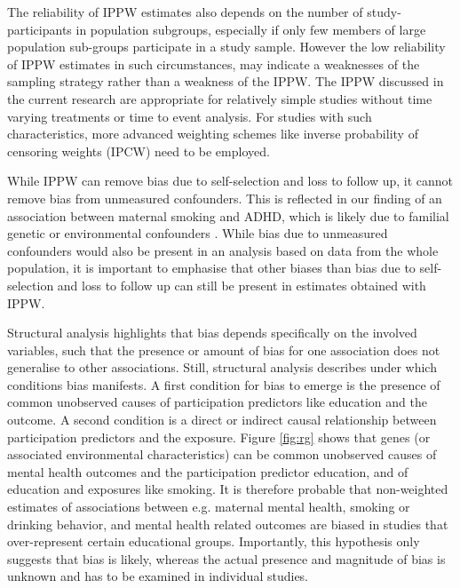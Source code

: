 \documentclass[12pt]{article}
\begin{document}
The reliability of IPPW estimates also depends on the number of study-participants in population subgroups, especially if only few members of large population sub-groups participate in a study sample. However the low reliability of IPPW estimates in such circumstances, may indicate a weaknesses of the sampling strategy rather than a weakness of the IPPW.
The IPPW discussed in the current research are appropriate for relatively simple studies without time varying treatments or time to event analysis. For studies with such characteristics, more advanced weighting schemes like inverse probability of censoring weights (IPCW\cite{Robins2000-fq}) need to be employed.

While IPPW can remove bias due to self-selection and loss to follow up, it cannot remove bias from unmeasured confounders. This is reflected in our finding of an association between maternal smoking and ADHD, which is likely due to familial genetic or environmental confounders \cite{Donovan2011-me}. While bias due to unmeasured confounders would also be present in an analysis based on data from the whole population, it is important to emphasise that other biases than bias due to self-selection and loss to follow up can still be present in estimates obtained with IPPW.  

Structural analysis highlights that bias depends specifically on the involved variables, such that the presence or amount of bias for one association does not generalise to other associations. Still, structural analysis describes under which conditions bias manifests. A first condition for bias to emerge is the presence of common unobserved causes of participation predictors like education and the outcome. A second condition is a direct or indirect causal relationship between participation predictors and the exposure. Figure \ref{fig:rg} shows that genes (or associated environmental characteristics) can be common unobserved causes of mental health outcomes and the participation predictor education, and of education and exposures like smoking. It is therefore probable that non-weighted estimates of associations between e.g. maternal mental health, smoking or drinking behavior, and mental health related outcomes are biased in studies that over-represent certain educational groups. Importantly, this hypothesis only suggests that bias is likely, whereas the actual presence and magnitude of bias is unknown and has to be examined in individual studies. 
\end{document}
